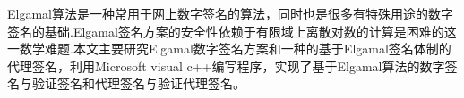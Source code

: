 Elgamal算法是一种常用于网上数字签名的算法，同时也是很多有特殊用途的数字签名的基础.Elgamal签名方案的安全性依赖于有限域上离散对数的计算是困难的这一数学难题.本文主要研究Elgamal数字签名方案和一种的基于Elgamal签名体制的代理签名，利用Microsoft visual c++编写程序，实现了基于Elgamal算法的数字签名与验证签名和代理签名与验证代理签名。